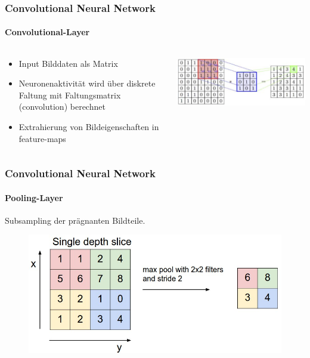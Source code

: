 \documentclass{beamer}
\begin{document}
\begin{frame}
\frametitle{Convolutional Neural Network}
\framesubtitle{Convolutional-Layer}

\begin{columns}[T]

\begin{column}[T]{5cm}
\begin{itemize}
\item{Input Bilddaten als Matrix}
\item{Neuronenaktivität wird über diskrete Faltung mit Faltungsmatrix (convolution) berechnet}
\item{Extrahierung von Bildeigenschaften in feature-maps}
\end{itemize}


\end{column}

\begin{column}[T]{7cm}
	\includegraphics[scale=0.44]{figures/convolution.jpg}
\end{column}

\end{columns}

\end{frame}

\begin{frame}
\frametitle{Convolutional Neural Network}
\framesubtitle{Pooling-Layer}

Subsampling der prägnanten Bildteile.

\begin{figure}
	\centering
	\includegraphics[width=\linewidth]{figures/maxpool.jpeg}
	\label{img:maxpooling}
\end{figure}
\end{frame}
\end{document}
